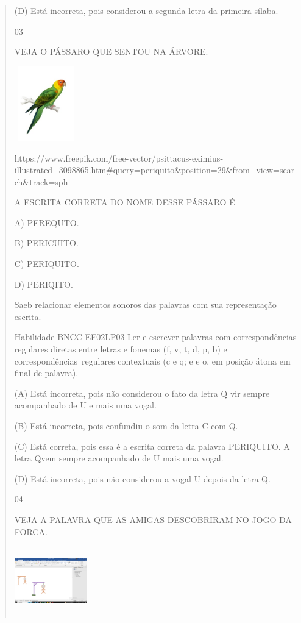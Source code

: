 {{{{\begin{verse}
{{\begin{escolha}
{{{{{(D) Está incorreta, pois considerou a segunda letra da primeira sílaba.

\num{03}

VEJA O PÁSSARO QUE SENTOU NA ÁRVORE.

\includegraphics[width=1.08542in,height=1.27222in]{media/image165.jpeg}

https://www.freepik.com/free-vector/psittacus-eximius-illustrated\_3098865.htm\#query=periquito\&position=29\&from\_view=search\&track=sph

A ESCRITA CORRETA DO NOME DESSE PÁSSARO É

A) PEREQUTO.

B) PERICUITO.

C) PERIQUITO.

D) PERIQITO.

Saeb relacionar elementos sonoros das palavras com sua representação
escrita.

Habilidade BNCC EF02LP03 Ler e escrever palavras com correspondências
regulares diretas entre letras e fonemas (f, v, t, d, p, b) e
correspondências~regulares contextuais (c e q; e e o, em posição átona
em final de palavra).

(A) Está incorreta, pois não considerou o fato da letra Q vir sempre
acompanhado de U e mais uma vogal.

(B) Está incorreta, pois confundiu o som da letra C com Q.

(C) Está correta, pois essa é a escrita correta da palavra PERIQUITO. A
letra Qvem sempre acompanhado de U mais uma vogal.

(D) Está incorreta, pois não considerou a vogal U depois da letra Q.

\num{04}

VEJA A PALAVRA QUE AS AMIGAS DESCOBRIRAM NO JOGO DA FORCA.

\includegraphics[width=1.24236in,height=1.17500in]{media/image166.png}

}}}}}
\end{escolha}}}
\end{verse}}}}}
